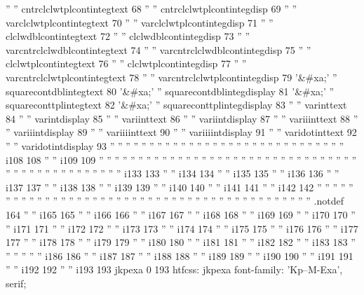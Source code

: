 '' '' cntrclclwtplcontintegtext 68
'' '' cntrclclwtplcontintegdisp 69
'' '' varclclwtplcontintegtext 70
'' '' varclclwtplcontintegdisp 71
'' '' clclwdblcontintegtext 72
'' '' clclwdblcontintegdisp 73
'' '' varcntrclclwdblcontintegtext 74
'' '' varcntrclclwdblcontintegdisp 75
'' '' clclwtplcontintegtext 76
'' '' clclwtplcontintegdisp 77
'' '' varcntrclclwtplcontintegtext 78
'' '' varcntrclclwtplcontintegdisp 79
'&#xa;' '' squarecontdblintegtext 80
'&#xa;' '' squarecontdblintegdisplay 81
'&#xa;' '' squareconttplintegtext 82
'&#xa;' '' squareconttplintegdisplay 83
'' '' varinttext 84
'' '' varintdisplay 85
'' '' variinttext 86
'' '' variintdisplay 87
'' '' variiinttext 88
'' '' variiintdisplay 89
'' '' variiiinttext 90
'' '' variiiintdisplay 91
'' '' varidotinttext 92
'' '' varidotintdisplay 93
'' ''  
'' ''  
'' ''  
'' ''  
'' ''  
'' ''  
'' ''  
'' ''  
'' ''  
'' ''  
'' ''  
'' ''  
'' ''  
'' ''  
'' '' i108 108
'' '' i109 109
'' ''  
'' ''  
'' ''  
'' ''  
'' ''  
'' ''  
'' ''  
'' ''  
'' ''  
'' ''  
'' ''  
'' ''  
'' ''  
'' ''  
'' ''  
'' ''  
'' ''  
'' ''  
'' ''  
'' ''  
'' ''  
'' ''  
'' ''  
'' '' i133 133
'' '' i134 134
'' '' i135 135
'' '' i136 136
'' '' i137 137
'' '' i138 138
'' '' i139 139
'' '' i140 140
'' '' i141 141
'' '' i142 142
'' ''  
'' ''  
'' ''  
'' ''  
'' ''  
'' ''  
'' ''  
'' ''  
'' ''  
'' ''  
'' ''  
'' ''  
'' ''  
'' ''  
'' ''  
'' ''  
'' ''  
'' ''  
'' ''  
'' ''  
'' ''  
'' '' .notdef 164
'' '' i165 165
'' '' i166 166
'' '' i167 167
'' '' i168 168
'' '' i169 169
'' '' i170 170
'' '' i171 171
'' '' i172 172
'' '' i173 173
'' '' i174 174
'' '' i175 175
'' '' i176 176
'' '' i177 177
'' '' i178 178
'' '' i179 179
'' '' i180 180
'' '' i181 181
'' '' i182 182
'' '' i183 183
'' ''  
'' ''  
'' '' i186 186
'' '' i187 187
'' '' i188 188
'' '' i189 189
'' '' i190 190
'' '' i191 191
'' '' i192 192
'' '' i193 193
jkpexa 0 193
htfcss:  jkpexa  font-family: 'Kp--M-Exa', serif;


